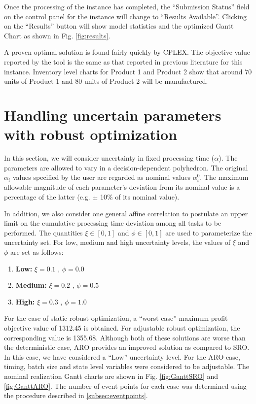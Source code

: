 Once the processing of the instance has completed, the ``Submission Status'' field on the control panel for the instance will change to ``Results Available''. Clicking on the ``Results'' button will show model statistics and the optimized Gantt Chart as shown in Fig. \ref{fig:results}.


A proven optimal solution is found fairly quickly by CPLEX. The objective value reported by the tool is the same as that reported in previous literature for this instance. Inventory level charts for Product 1 and Product 2 show that around 70 units of Product 1 and 80 units of Product 2 will be manufactured.

\section{Handling uncertain parameters with robust optimization}
In this section, we will consider uncertainty in fixed processing time ($\alpha$). The parameters are allowed to vary in a decision-dependent polyhedron. The original $\alpha_i$ values specified by the user are regarded as nominal values $\alpha_i^0$. The maximum allowable magnitude of each parameter's deviation from its nominal value is a percentage of the latter (e.g. $\pm$ 10\% of its nominal value).

In addition, we also consider one general affine correlation to postulate an upper limit on the cumulative processing time deviation among all tasks to be performed. The quantities $\xi \in [0,1]$ and $\phi \in [0,1]$ are used to parameterize the uncertainty set. For low, medium and high uncertainty levels, the values of $\xi$ and $\phi$ are set as follows:
\begin{enumerate}
\item \textbf{Low:} $\xi = 0.1$ , $\phi = 0.0$
\item \textbf{Medium:} $\xi = 0.2$ , $\phi = 0.5$
\item \textbf{High:} $\xi = 0.3$ , $\phi = 1.0$
\end{enumerate}

For the case of static robust optimization, a ``worst-case'' maximum profit objective value of 1312.45 is obtained. For adjustable robust optimization, the corresponding value is 1355.68. Although both of these solutions are worse than the deterministic case, ARO provides an improved solution as compared to SRO. In this case, we have considered a ``Low'' uncertainty level. For the ARO case, timing, batch size and state level variables were considered to be adjustable. The nominal realization Gantt charts are shown in Fig. \ref{fig:GanttSRO} and \ref{fig:GanttARO}. The number of event points for each case was determined using the procedure described in \ref{subsec:eventpoints}. 


